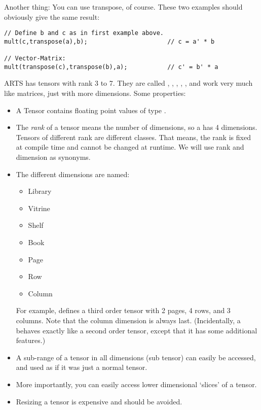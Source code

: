 Another thing: You can use transpose, of course. These two examples
should obviously give the same result:

\begin{verbatim}
// Define b and c as in first example above.
mult(c,transpose(a),b);                      // c = a' * b

// Vector-Matrix:
mult(transpose(c),transpose(b),a);           // c' = b' * a
\end{verbatim}


\label{sec:matpack:tensors}

ARTS has tensors with rank 3 to 7. They are called
, , ,
, , and work very much like
matrices, just with more dimensions. Some properties:
\begin{itemize}
\item A Tensor contains floating point values of type .
\item The \emph{rank} of a tensor means the number of dimensions, so a
   has 4 dimensions. Tensors of different rank are
  different classes. That means, the rank is fixed at compile time and
  cannot be changed at runtime. We will use rank and dimension as
  synonyms. 
\item The different dimensions are named:
\begin{itemize}
\item Library
\item Vitrine
\item Shelf
\item Book
\item Page
\item Row
\item Column
\end{itemize}
For example,  defines a third order tensor with 2
pages, 4 rows, and 3 columns. Note that the column dimension is always
last. (Incidentally, a  behaves exactly like a second
order tensor, except that it has some additional features.) 
\item A sub-range of a tensor in all dimensions (sub tensor) can
  easily be accessed, and used as if it was just a normal tensor.
\item More importantly, you can easily access lower dimensional
  `slices' of a tensor. 
\item Resizing a tensor is expensive and should be avoided.
\end{itemize}

